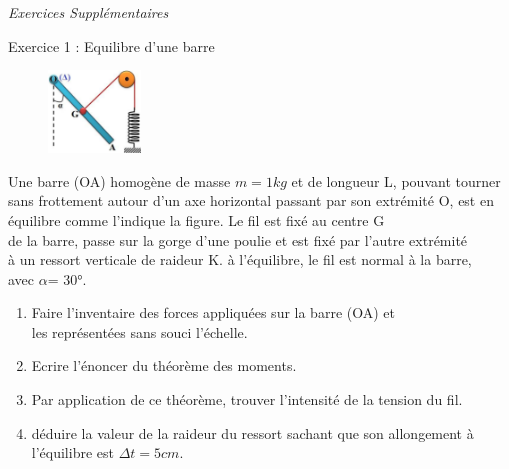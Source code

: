 \documentclass[12pt, french]{article}
\begin{document}
\begin{center}
\end{center}
\begin{center}
   \Large{ \em{Exercices Supplémentaires}}
\end{center}

   \begin{Box2}{Exercice 1 : Equilibre d'une barre   }

\begin{figure}
  \begin{center}
	\includegraphics[width=0.22\textwidth]{./img/ex00.png}
  \end{center}
\end{figure}

Une barre (OA) homogène de masse $m = 1kg$ et de longueur L,
pouvant tourner sans frottement autour d'un axe horizontal passant
par son extrémité O, est en équilibre comme l'indique la figure.
Le fil est fixé au centre G \\de la barre, passe sur la gorge d'une
poulie et est fixé par l'autre extrémité \\à un ressort verticale de
raideur K. à l'équilibre, le fil est normal à la barre, \\avec $\alpha$= 30°.

\begin{enumerate}
	\item  Faire l’inventaire des forces appliquées sur la barre (OA) et \\les
représentées sans souci l'échelle.
\item  Ecrire l'énoncer du théorème des moments.
\item  Par application de ce théorème, trouver l'intensité de la tension du fil.
\item  déduire la valeur de la raideur du ressort sachant que son allongement à l'équilibre est $\Delta{t} = 5cm$.
\end{enumerate}
\end{Box2}
\end{document}
